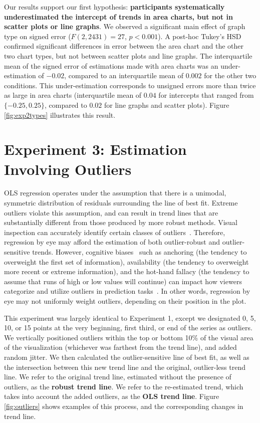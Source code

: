 \documentclass{sigchi}
\begin{document}
Our results support our first hypothesis: \textbf{participants systematically underestimated the intercept of trends in area charts, but not in scatter plots or line graphs}. We observed a significant main effect of graph type on signed error ($F(2,2431)=27$, $p<0.001$). A post-hoc Tukey's HSD confirmed significant differences in error between the area chart and the other two chart types, but not between scatter plots and line graphs. The interquartile mean of the signed error of estimations made with area charts was an under-estimation of $-0.02$, compared to an interquartile mean of $0.002$ for the other two conditions. This under-estimation corresponds to unsigned errors more than twice as large in area charts (interquartile mean of $0.04$ for intercepts that ranged from $\{-0.25,0.25\}$, compared to $0.02$ for line graphs and scatter plots). Figure \ref{fig:exp2types} illustrates this result.

\section{Experiment 3: Estimation Involving Outliers}

\outlierFig

\outliersFig

OLS regression operates under the assumption that there is a unimodal, symmetric distribution of residuals surrounding the line of best fit. Extreme outliers violate this assumption, and can result in trend lines that are substantially different from those produced by more robust methods. Visual inspection can accurately identify certain classes of outliers~\cite{albers2014task}. Therefore, regression by eye may afford the estimation of both outlier-robust and outlier-sensitive trends. However, cognitive biases~\cite{tversky1975judgment} such as anchoring (the tendency to overweight the first set of information), availability (the tendency to overweight more recent or extreme information), and the hot-hand fallacy (the tendency to assume that runs of high or low values will continue) can impact how viewers categorize and utilize outliers in prediction tasks~\cite{campbell2009anchoring, ji2001culture}. In other words, regression by eye may not uniformly weight outliers, depending on their position in the plot.

This experiment was largely identical to Experiment 1, except we designated 0, 5, 10, or 15 points at the very beginning, first third, or end of the series as outliers. We vertically positioned outliers within the top or bottom 10\% of the visual area of the visualization (whichever was farthest from the trend line), and added random jitter. We then calculated the outlier-sensitive line of best fit, as well as the intersection between this new trend line and the original, outlier-less trend line. We refer to the original trend line, estimated without the presence of outliers, as the \textbf{robust trend line}. We refer to the re-estimated trend, which takes into account the added outliers, as the \textbf{OLS trend line}. Figure \ref{fig:outliers} shows examples of this process, and the corresponding changes in trend line.
\end{document}
